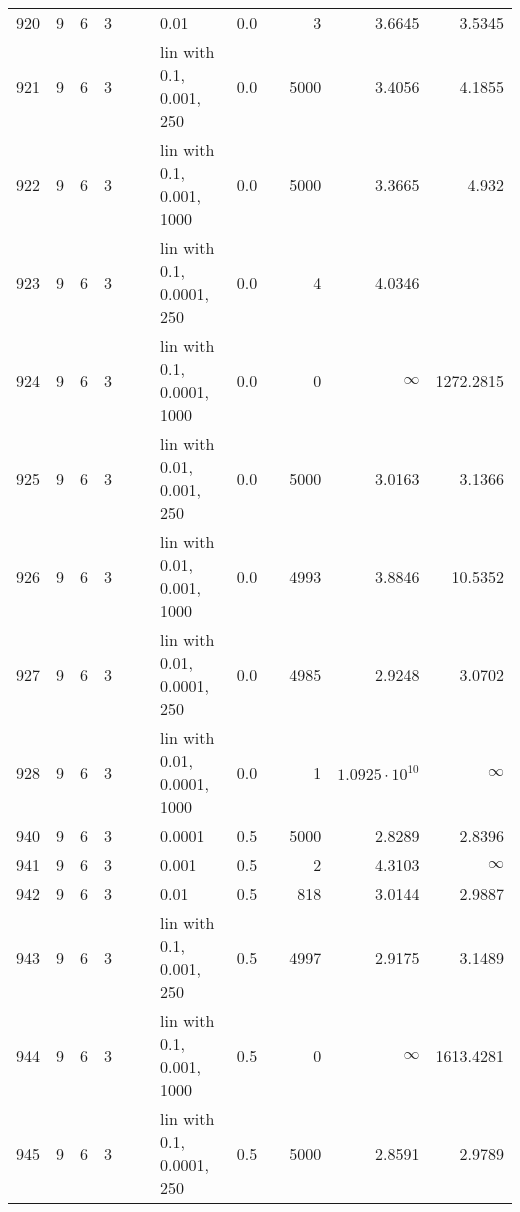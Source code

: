 \begin{longtable}{lrrrrrlrrrrr}
 920 &       9 & 6 & 3 &   &   &                        0.01 &  0.0 &        &       3 &                 3.6645 &                 3.5345 \\
 921 &       9 & 6 & 3 &   &   &    lin with 0.1, 0.001, 250 &  0.0 &        &    5000 &                 3.4056 &                 4.1855 \\
 922 &       9 & 6 & 3 &   &   &   lin with 0.1, 0.001, 1000 &  0.0 &        &    5000 &                 3.3665 &                  4.932 \\
 923 &       9 & 6 & 3 &   &   &   lin with 0.1, 0.0001, 250 &  0.0 &        &       4 &                 4.0346 &                        \\
 924 &       9 & 6 & 3 &   &   &  lin with 0.1, 0.0001, 1000 &  0.0 &        &       0 &               $\infty$ &              1272.2815 \\
 925 &       9 & 6 & 3 &   &   &   lin with 0.01, 0.001, 250 &  0.0 &        &    5000 &                 3.0163 &                 3.1366 \\
 926 &       9 & 6 & 3 &   &   &  lin with 0.01, 0.001, 1000 &  0.0 &        &    4993 &                 3.8846 &                10.5352 \\
 927 &       9 & 6 & 3 &   &   &  lin with 0.01, 0.0001, 250 &  0.0 &        &    4985 &                 2.9248 &                 3.0702 \\
 928 &       9 & 6 & 3 &   &   & lin with 0.01, 0.0001, 1000 &  0.0 &        &       1 &  $1.0925\cdot 10^{10}$ &               $\infty$ \\
 940 &       9 & 6 & 3 &   &   &                      0.0001 &  0.5 &        &    5000 &                 2.8289 &                 2.8396 \\
 941 &       9 & 6 & 3 &   &   &                       0.001 &  0.5 &        &       2 &                 4.3103 &               $\infty$ \\
 942 &       9 & 6 & 3 &   &   &                        0.01 &  0.5 &        &     818 &                 3.0144 &                 2.9887 \\
 943 &       9 & 6 & 3 &   &   &    lin with 0.1, 0.001, 250 &  0.5 &        &    4997 &                 2.9175 &                 3.1489 \\
 944 &       9 & 6 & 3 &   &   &   lin with 0.1, 0.001, 1000 &  0.5 &        &       0 &               $\infty$ &              1613.4281 \\
 945 &       9 & 6 & 3 &   &   &   lin with 0.1, 0.0001, 250 &  0.5 &        &    5000 &                 2.8591 &                 2.9789 \\

\end{longtable}
